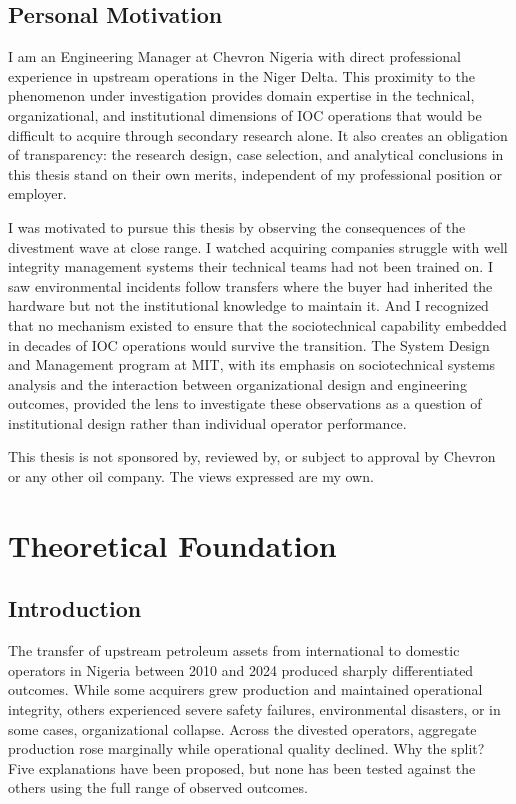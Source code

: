 \documentclass[twoside,fontset=lmodern]{mitthesis}
\begin{document}
\hypertarget{personal-motivation}{%
\section{Personal Motivation}\label{personal-motivation}}

I am an Engineering Manager at Chevron Nigeria with direct professional
experience in upstream operations in the Niger Delta. This proximity to
the phenomenon under investigation provides domain expertise in the
technical, organizational, and institutional dimensions of IOC
operations that would be difficult to acquire through secondary research
alone. It also creates an obligation of transparency: the research
design, case selection, and analytical conclusions in this thesis stand
on their own merits, independent of my professional position or
employer.

I was motivated to pursue this thesis by observing the consequences of
the divestment wave at close range. I watched acquiring companies
struggle with well integrity management systems their technical teams
had not been trained on. I saw environmental incidents follow transfers
where the buyer had inherited the hardware but not the institutional
knowledge to maintain it. And I recognized that no mechanism existed to
ensure that the sociotechnical capability embedded in decades of IOC
operations would survive the transition. The System Design and
Management program at MIT, with its emphasis on sociotechnical systems
analysis and the interaction between organizational design and
engineering outcomes, provided the lens to investigate these
observations as a question of institutional design rather than
individual operator performance.

This thesis is not sponsored by, reviewed by, or subject to approval by
Chevron or any other oil company. The views expressed are my own.


\hypertarget{theoretical-foundation}{%
\chapter{Theoretical Foundation}\label{theoretical-foundation}}

\hypertarget{introduction}{%
\section{Introduction}\label{introduction}}

The transfer of upstream petroleum assets from international to domestic
operators in Nigeria between 2010 and 2024 produced sharply
differentiated outcomes. While some acquirers grew production and
maintained operational integrity, others experienced severe safety
failures, environmental disasters, or in some cases, organizational
collapse. Across the divested operators, aggregate production rose
marginally while operational quality declined. Why the split? Five
explanations have been proposed, but none has been tested against the
others using the full range of observed outcomes.
\end{document}
